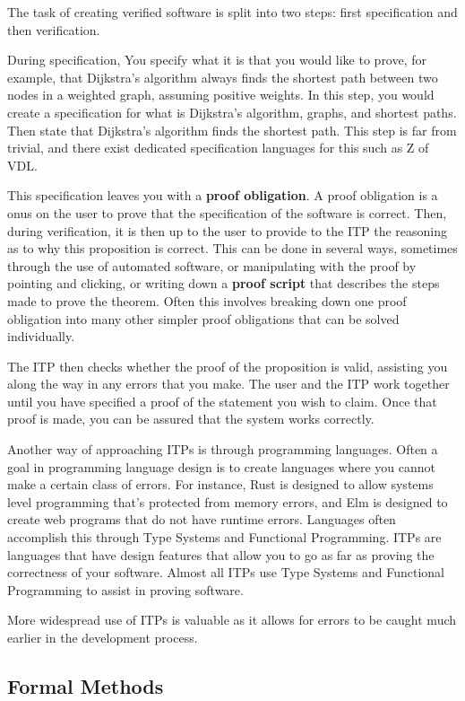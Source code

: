 \documentclass[
]{article}
\begin{document}
The task of creating verified software is split into two steps: first
specification and then verification.

During specification, You specify what it is that you would like to
prove, for example, that Dijkstra's algorithm always finds the shortest
path between two nodes in a weighted graph, assuming positive weights.
In this step, you would create a specification for what is Dijkstra's
algorithm, graphs, and shortest paths. Then state that Dijkstra's
algorithm finds the shortest path. This step is far from trivial, and
there exist dedicated specification languages for this such as Z of VDL.

This specification leaves you with a \textbf{proof obligation}. A proof
obligation is a onus on the user to prove that the specification of the
software is correct. Then, during verification, it is then up to the
user to provide to the ITP the reasoning as to why this proposition is
correct. This can be done in several ways, sometimes through the use of
automated software, or manipulating with the proof by pointing and
clicking, or writing down a \textbf{proof script} that describes the
steps made to prove the theorem. Often this involves breaking down one
proof obligation into many other simpler proof obligations that can be
solved individually.

The ITP then checks whether the proof of the proposition is valid,
assisting you along the way in any errors that you make. The user and
the ITP work together until you have specified a proof of the statement
you wish to claim. Once that proof is made, you can be assured that the
system works correctly.

Another way of approaching ITPs is through programming languages. Often
a goal in programming language design is to create languages where you
cannot make a certain class of errors. For instance, Rust is designed to
allow systems level programming that's protected from memory errors, and
Elm is designed to create web programs that do not have runtime errors.
Languages often accomplish this through Type Systems and Functional
Programming. ITPs are languages that have design features that allow you
to go as far as proving the correctness of your software. Almost all
ITPs use Type Systems and Functional Programming to assist in proving
software.

More widespread use of ITPs is valuable as it allows for errors to be
caught much earlier in the development process.

\hypertarget{formal-methods}{%
\subsection{Formal Methods}\label{formal-methods}}
\end{document}
